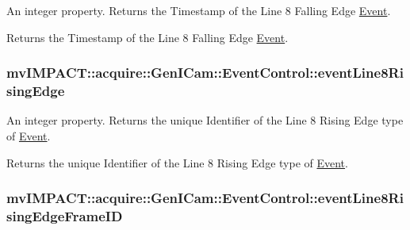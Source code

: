 An integer property. Returns the Timestamp of the Line 8 Falling Edge \hyperlink{classmv_i_m_p_a_c_t_1_1acquire_1_1_event}{Event}. 

Returns the Timestamp of the Line 8 Falling Edge \hyperlink{classmv_i_m_p_a_c_t_1_1acquire_1_1_event}{Event}. \hypertarget{classmv_i_m_p_a_c_t_1_1acquire_1_1_gen_i_cam_1_1_event_control_ae88b5ca4c06470342c7b472b970aca06}{
\subsubsection[{event\+Line8\+Rising\+Edge}]{ mv\+I\+M\+P\+A\+C\+T\+::acquire\+::\+Gen\+I\+Cam\+::\+Event\+Control\+::event\+Line8\+Rising\+Edge}}\label{classmv_i_m_p_a_c_t_1_1acquire_1_1_gen_i_cam_1_1_event_control_ae88b5ca4c06470342c7b472b970aca06}


An integer property. Returns the unique Identifier of the Line 8 Rising Edge type of \hyperlink{classmv_i_m_p_a_c_t_1_1acquire_1_1_event}{Event}. 

Returns the unique Identifier of the Line 8 Rising Edge type of \hyperlink{classmv_i_m_p_a_c_t_1_1acquire_1_1_event}{Event}. \hypertarget{classmv_i_m_p_a_c_t_1_1acquire_1_1_gen_i_cam_1_1_event_control_a921bbd8b9dca1440fcec818f651f6ff6}{
\subsubsection[{event\+Line8\+Rising\+Edge\+Frame\+I\+D}]{ mv\+I\+M\+P\+A\+C\+T\+::acquire\+::\+Gen\+I\+Cam\+::\+Event\+Control\+::event\+Line8\+Rising\+Edge\+Frame\+I\+D}}\label{classmv_i_m_p_a_c_t_1_1acquire_1_1_gen_i_cam_1_1_event_control_a921bbd8b9dca1440fcec818f651f6ff6}


